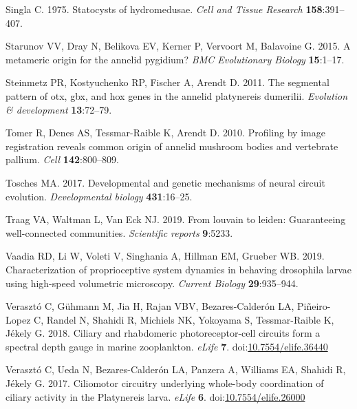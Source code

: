 \documentclass[
  11pt,
]{article}
\newlength{\cslhangindent}
\newenvironment{CSLReferences}[2] %
 {\begin{list}{}{%
  \setlength{\itemindent}{0pt}
  \setlength{\leftmargin}{0pt}
  \setlength{\parsep}{0pt}
  \ifodd #1
   \setlength{\leftmargin}{\cslhangindent}
   \setlength{\itemindent}{-1\cslhangindent}
  \fi
  \setlength{\itemsep}{#2\baselineskip}}}
 {\end{list}}
\begin{document}
\begin{CSLReferences}{1}{0}
Singla C. 1975. Statocysts of hydromedusae. \emph{Cell and Tissue
Research} \textbf{158}:391--407.

Starunov VV, Dray N, Belikova EV, Kerner P, Vervoort M, Balavoine G.
2015. A metameric origin for the annelid pygidium? \emph{BMC
Evolutionary Biology} \textbf{15}:1--17.

Steinmetz PR, Kostyuchenko RP, Fischer A, Arendt D. 2011. The segmental
pattern of otx, gbx, and hox genes in the annelid platynereis dumerilii.
\emph{Evolution \& development} \textbf{13}:72--79.

Tomer R, Denes AS, Tessmar-Raible K, Arendt D. 2010. Profiling by image
registration reveals common origin of annelid mushroom bodies and
vertebrate pallium. \emph{Cell} \textbf{142}:800--809.

Tosches MA. 2017. Developmental and genetic mechanisms of neural circuit
evolution. \emph{Developmental biology} \textbf{431}:16--25.

Traag VA, Waltman L, Van Eck NJ. 2019. From louvain to leiden:
Guaranteeing well-connected communities. \emph{Scientific reports}
\textbf{9}:5233.

Vaadia RD, Li W, Voleti V, Singhania A, Hillman EM, Grueber WB. 2019.
Characterization of proprioceptive system dynamics in behaving
drosophila larvae using high-speed volumetric microscopy. \emph{Current
Biology} \textbf{29}:935--944.

Verasztó C, Gühmann M, Jia H, Rajan VBV, Bezares-Calderón LA,
Piñeiro-Lopez C, Randel N, Shahidi R, Michiels NK, Yokoyama S,
Tessmar-Raible K, Jékely G. 2018. Ciliary and rhabdomeric
photoreceptor-cell circuits form a spectral depth gauge in marine
zooplankton. \emph{eLife} \textbf{7}.
doi:\href{https://doi.org/10.7554/elife.36440}{10.7554/elife.36440}

Verasztó C, Ueda N, Bezares-Calderón LA, Panzera A, Williams EA, Shahidi
R, Jékely G. 2017. Ciliomotor circuitry underlying whole-body
coordination of ciliary activity in the Platynereis larva. \emph{eLife}
\textbf{6}.
doi:\href{https://doi.org/10.7554/elife.26000}{10.7554/elife.26000}


\end{CSLReferences}
\end{document}
